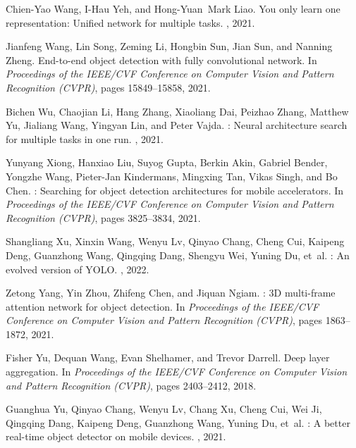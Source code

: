 \documentclass[10pt,twocolumn,letterpaper]{article}
\begin{document}
{\begin{thebibliography}{100}
				Chien-Yao Wang, I-Hau Yeh, and Hong-Yuan~Mark Liao.
				\newblock You only learn one representation: Unified network for multiple
				tasks.
				, 2021.
				
				Jianfeng Wang, Lin Song, Zeming Li, Hongbin Sun, Jian Sun, and Nanning Zheng.
				\newblock End-to-end object detection with fully convolutional network.
				\newblock In {\em Proceedings of the IEEE/CVF Conference on Computer Vision and
					Pattern Recognition (CVPR)}, pages 15849--15858, 2021.
				
				Bichen Wu, Chaojian Li, Hang Zhang, Xiaoliang Dai, Peizhao Zhang, Matthew Yu,
				Jialiang Wang, Yingyan Lin, and Peter Vajda.
				: Neural architecture search for multiple tasks in one run.
				, 2021.
				
				Yunyang Xiong, Hanxiao Liu, Suyog Gupta, Berkin Akin, Gabriel Bender, Yongzhe
				Wang, Pieter-Jan Kindermans, Mingxing Tan, Vikas Singh, and Bo Chen.
				: Searching for object detection architectures for mobile
				accelerators.
				\newblock In {\em Proceedings of the IEEE/CVF Conference on Computer Vision and
					Pattern Recognition (CVPR)}, pages 3825--3834, 2021.
				
				Shangliang Xu, Xinxin Wang, Wenyu Lv, Qinyao Chang, Cheng Cui, Kaipeng Deng,
				Guanzhong Wang, Qingqing Dang, Shengyu Wei, Yuning Du, et~al.
				: An evolved version of {YOLO}.
				, 2022.
				
				Zetong Yang, Yin Zhou, Zhifeng Chen, and Jiquan Ngiam.
				: {3D} multi-frame attention network for object detection.
				\newblock In {\em Proceedings of the IEEE/CVF Conference on Computer Vision and
					Pattern Recognition (CVPR)}, pages 1863--1872, 2021.
				
				Fisher Yu, Dequan Wang, Evan Shelhamer, and Trevor Darrell.
				\newblock Deep layer aggregation.
				\newblock In {\em Proceedings of the IEEE/CVF Conference on Computer Vision and
					Pattern Recognition (CVPR)}, pages 2403--2412, 2018.
				
				Guanghua Yu, Qinyao Chang, Wenyu Lv, Chang Xu, Cheng Cui, Wei Ji, Qingqing
				Dang, Kaipeng Deng, Guanzhong Wang, Yuning Du, et~al.
				: A better real-time object detector on mobile devices.
				, 2021.
				

\end{thebibliography}}
\end{document}
